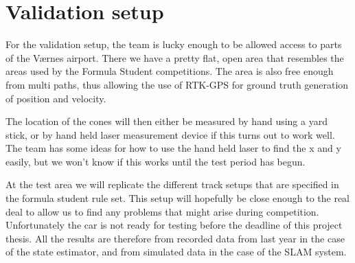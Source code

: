 \section{Validation setup}
For the validation setup, the team is lucky enough to be allowed access to parts of the V\ae rnes airport. There we have a pretty flat, open area that resembles the areas used by the Formula Student competitions. The area is also free enough from multi paths, thus allowing the use of \gls{RTK-GPS} for ground truth generation of position and velocity. 

The location of the cones will then either be measured by hand using a yard stick, or by hand held laser measurement device if this turns out to work well. The team has some ideas for how to use the hand held laser to find the x and y easily, but we won't know if this works until the test period has begun. 

At the test area we will replicate the different track setups that are specified in the formula student rule set. This setup will hopefully be close enough to the real deal to allow us to find any problems that might arise during competition. Unfortunately the car is not ready for testing before the deadline of this project thesis. All the results are therefore from recorded data from last year in the case of the state estimator, and from simulated data in the case of the \gls{SLAM} system. 

